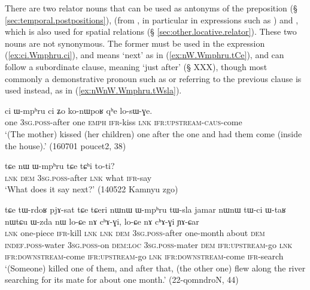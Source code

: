 There are two relator nouns that can be used as antonyms of the preposition  (§ \ref{sec:temporal.postpositions}),   (from , in particular in expressions such as ) and , which is also used for spatial relations (§ \ref{sec:other.locative.relator}). These two nouns are not synonymous. The former must be used in the expression  (\ref{ex:ci.Wmphru.ci}), and means `next' as in (\ref{ex:nW.Wmphru.tCe}), and can follow a subordinate clause, meaning `just after' (§ XXX), though most commonly a demonstrative pronoun such as  or  referring to the previous clause is used instead, as in (\ref{ex:nWnW.Wmphru.tWsla}).

\begin{exe}
\ex \label{ex:ci.Wmphru.ci}
 \gll ci ɯ-mpʰru ci ʑo ko-nɯpoʁ qʰe lo-sɯ-ɣe. \\
 one \textsc{3sg}.\textsc{poss}-after one \textsc{emph} \textsc{ifr}-kiss \textsc{lnk} \textsc{ifr}:\textsc{upstream}-\textsc{caus}-come  \\
\glt `(The mother) kissed (her children) one after the one and had them come (inside the house).' (160701 poucet2, 38)
\end{exe}

\begin{exe}
\ex \label{ex:nW.Wmphru.tCe}
 \gll  tɕe nɯ ɯ-mpʰru tɕe tɕʰi to-ti? \\
 \textsc{lnk} \textsc{dem} \textsc{3sg}.\textsc{poss}-after \textsc{lnk} what \textsc{ifr}-say \\
\glt `What does it say next?' (140522 Kamnyu zgo)
\end{exe}

\begin{exe}
\ex \label{ex:nWnW.Wmphru.tWsla}
 \gll tɕe tɯ-rdoʁ pjɤ-sat tɕe tɕeri nɯnɯ ɯ-mpʰru tɯ-sla jamar nɯnɯ tɯ-ci ɯ-taʁ nɯtɕu ɯ-zda nɯ lo-ɕe nɤ cʰɤ-ɣi, lo-ɕe nɤ cʰɤ-ɣi ɲɤ-ɕar \\
\textsc{lnk} one-piece \textsc{ifr}-kill \textsc{lnk} \textsc{lnk} \textsc{dem} \textsc{3sg}.\textsc{poss}-after one-month about \textsc{dem} \textsc{indef}.\textsc{poss}-water \textsc{3sg}.\textsc{poss}-on \textsc{dem}:\textsc{loc} \textsc{3sg}.\textsc{poss}-mater \textsc{dem} \textsc{ifr}:\textsc{upstream}-go \textsc{lnk} \textsc{ifr}:\textsc{downstream}-come  \textsc{ifr}:\textsc{upstream}-go \textsc{lnk} \textsc{ifr}:\textsc{downstream}-come \textsc{ifr}-search \\
\glt `(Someone) killed one of them, and after that, (the other one) flew along the river searching for its mate for about one month.' (22-qomndroN, 44)
\end{exe}

